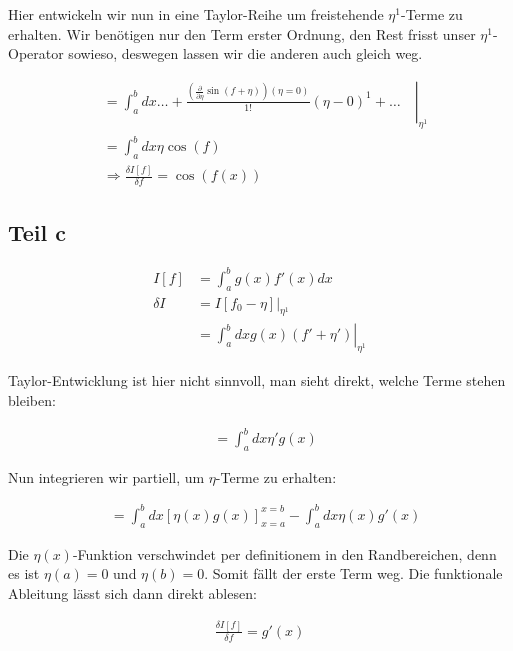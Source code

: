 \documentclass[a4paper,german,12pt,smallheadings]{scrartcl}
\begin{document}
Hier entwickeln wir nun in eine Taylor-Reihe um freistehende $\eta^1$-Terme zu
erhalten. Wir benötigen nur den Term erster Ordnung, den Rest frisst unser
$\eta^1$-Operator sowieso, deswegen lassen wir die anderen auch gleich weg.

\begin{align*}
  &=\left.\int_a^b dx \dots + \frac{\left(\frac{\partial}{\partial \eta} \sin(f+\eta)\right)(\eta=0)}{1!} (\eta - 0)^1 + \dots\quad\right|_{\eta^1} \\
  &=\int_a^b dx \eta \cos(f) \\
  &\Rightarrow \frac{\delta I[f]}{\delta f} = \cos(f(x))
\end{align*}

\subsection*{Teil c}
\begin{align*}
  I[f] &= \int_a^b g(x)f'(x) dx \\
  \delta I &= \left.I[f_0 - \eta]\right|_{\eta^1} \\
  &=\left.\int_a^b dx g(x)(f' + \eta') \right|_{\eta^1}
\end{align*}

Taylor-Entwicklung ist hier nicht sinnvoll, man sieht direkt, welche Terme stehen bleiben:

\begin{align*}
  &=\int_a^b dx \eta' g(x)
\end{align*}

Nun integrieren wir partiell, um $\eta$-Terme zu erhalten:

\begin{align*}
  &=\int_a^b dx \left[\eta(x) g(x)\right]_{x=a}^{x=b} - \int_a^b dx \eta(x) g'(x)
\end{align*}

Die $\eta(x)$-Funktion verschwindet per definitionem in den Randbereichen, denn
es ist $\eta(a) = 0$ und $\eta(b) = 0$. Somit fällt der erste Term weg. Die
funktionale Ableitung lässt sich dann direkt ablesen:

\begin{align*}
  \frac{\delta I[f]}{\delta f} = g'(x)
\end{align*}
\end{document}
